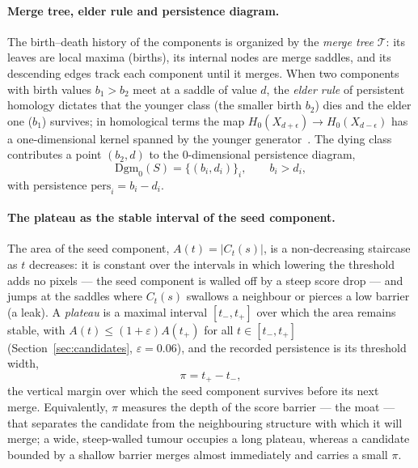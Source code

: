 \documentclass[11pt,a4paper]{article}
\begin{document}
\paragraph{Merge tree, elder rule and persistence diagram.} The birth--death
history of the components is organized by the \emph{merge tree} $\mathcal{T}$: its
leaves are local maxima (births), its internal nodes are merge saddles, and its
descending edges track each component until it merges. When two components with
birth values $b_1>b_2$ meet at a saddle of value $d$, the \emph{elder rule} of
persistent homology dictates that the younger class (the smaller birth $b_2$) dies
and the elder one ($b_1$) survives; in homological terms the map
$H_0(X_{d+\epsilon})\to H_0(X_{d-\epsilon})$ has a one-dimensional kernel spanned
by the younger generator~\cite{edelsbrunner2002}. The dying class contributes a
point $(b_2,d)$ to the $0$-dimensional persistence diagram,
\begin{equation}
\mathrm{Dgm}_0(S)=\{(b_i,d_i)\}_i,\qquad b_i>d_i,
\label{eq:dgm}
\end{equation}
with persistence $\mathrm{pers}_i=b_i-d_i$.

\paragraph{The plateau as the stable interval of the seed component.} The area of
the seed component, $A(t)=|C_t(s)|$, is a non-decreasing staircase as $t$
decreases: it is constant over the intervals in which lowering the threshold adds
no pixels --- the seed component is walled off by a steep score drop --- and jumps
at the saddles where $C_t(s)$ swallows a neighbour or pierces a low barrier (a
leak). A \emph{plateau} is a maximal interval $[t_-,t_+]$ over which the area
remains stable, with $A(t)\le(1+\varepsilon)A(t_+)$ for all $t\in[t_-,t_+]$
(Section~\ref{sec:candidates}, $\varepsilon=0.06$), and the recorded persistence
is its threshold width,
\begin{equation}
\pi=t_+-t_-,
\label{eq:pi-def}
\end{equation}
the vertical margin over which the seed component survives before its next merge.
Equivalently, $\pi$ measures the depth of the score barrier --- the moat --- that
separates the candidate from the neighbouring structure with which it will merge;
a wide, steep-walled tumour occupies a long plateau, whereas a candidate bounded
by a shallow barrier merges almost immediately and carries a small $\pi$.
\end{document}
